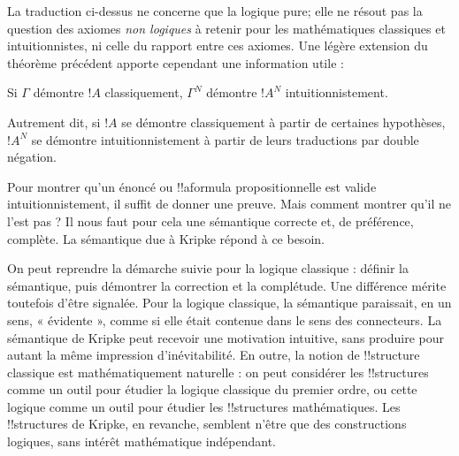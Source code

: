 \documentclass[../../../include/open-logic-section]{subfiles}
\begin{document}
La traduction ci-dessus ne concerne que la logique pure; elle ne
résout pas la question des axiomes \emph{non logiques} à retenir
pour les mathématiques classiques et intuitionnistes, ni celle
du rapport entre ces axiomes. Une légère extension du théorème
précédent apporte cependant une information utile :

\begin{thm}
Si $\Gamma$ démontre $!A$ classiquement, $\Gamma^N$ démontre
$!A^N$ intuitionnistement.
\end{thm}

Autrement dit, si $!A$ se démontre classiquement à partir de
certaines hypothèses, $!A^N$ se démontre intuitionnistement à
partir de leurs traductions par double négation.

Pour montrer qu'un énoncé ou !!a{formula} propositionnelle est
valide intuitionnistement, il suffit de donner une preuve. Mais
comment montrer qu'il ne l'est pas ? Il nous faut pour cela une
sémantique correcte et, de préférence, complète. La sémantique
due à Kripke répond à ce besoin.

On peut reprendre la démarche suivie pour la logique classique :
définir la sémantique, puis démontrer la correction et la complétude.
Une différence mérite toutefois d'être signalée. Pour la logique
classique, la sémantique paraissait, en un sens, « évidente »,
comme si elle était contenue dans le sens des connecteurs. La
sémantique de Kripke peut recevoir une motivation intuitive, sans
produire pour autant la même impression d'inévitabilité. En outre,
la notion de !!{structure} classique est mathématiquement naturelle :
on peut considérer les !!{structure}s comme un outil pour étudier
la logique classique du premier ordre, ou cette logique comme un
outil pour étudier les !!{structure}s mathématiques. Les
!!{structure}s de Kripke, en revanche, semblent n'être que des
constructions logiques, sans intérêt mathématique indépendant.
\end{document}
